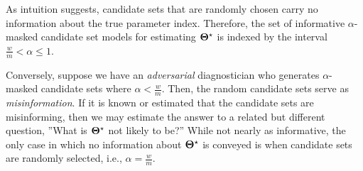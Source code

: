 \documentclass[
    11pt,
    extrafontsizes,
    article,
    oldfontcommands,
    final,
    oneside,
    openany,
    hidelinks]{memoir}
\begin{document}
As intuition suggests, candidate sets that are randomly chosen carry no information about the true parameter index.
Therefore, the set of informative $\alpha$-masked candidate set models for estimating ${\boldsymbol{\Theta}}^{\star}$ is indexed by the interval $\frac{w}{m} < \alpha \leq 1$.
\begin{remark}
Conversely, suppose we have an \emph{adversarial} diagnostician who generates $\alpha$-masked candidate sets where $\alpha < \frac{w}{m}$.
Then, the random candidate sets serve as \emph{misinformation}.
If it is known or estimated that the candidate sets are misinforming, then we may estimate the answer to a related but different question, ''What is ${\boldsymbol{\Theta}}^{\star}$ not likely to be?''
While not nearly as informative, the only case in which no information about ${\boldsymbol{\Theta}}^{\star}$ is conveyed is when candidate sets are randomly selected, i.e., $\alpha = \frac{w}{m}$.
\end{remark}
\end{document}
